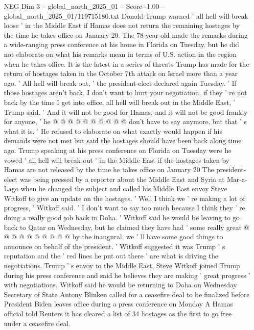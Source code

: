 \begin{textsample}{NEG Dim 3 – global\_north\_2025\_01 – Score -1.00 – global\_north\_2025\_01/119715180.txt}  \label{ex:f3_neg_200}
Donald Trump warned ' all hell will break loose ' in the Middle East if Hamas does not return the remaining hostages by the time he takes office on January 20.
The 78-year-old made the remarks during a wide-ranging press conference at his home in Florida on Tuesday, but he did not elaborate on what his remarks mean in terms of U.S. action in the region when he takes office.
It is the latest in a series of threats Trump has made for the return of hostages taken in the October 7th attack on Israel more than a year ago. ' All hell will break out, ' the president-elect declared again Tuesday. ' If those hostages aren't back, I don't want to hurt your negotiation, if they ' re not back by the time I get into office, all hell will break out in the Middle East, ' Trump said. ' And it will not be good for Hamas, and it will not be good frankly for anyone, ' he @ @ @ @ @ @ @ @ @ @ don't have to say anymore, but that ' s what it is. ' He refused to elaborate on what exactly would happen if his demands were not met but said the hostages should have been back along time ago.
Trump speaking at his press conference on Florida on Tuesday were he vowed ' all hell will break out ' in the Middle East if the hostages taken by Hamas are not released by the time he takes office on January 20 The president-elect was being pressed by a reporter about the Middle East and Syria at Mar-a-Lago when he changed the subject and called his Middle East envoy Steve Witkoff to give an update on the hostages. ' Well I think we ' re making a lot of progress, ' Witkoff said. ' I don't want to say too much because I think they ' re doing a really good job back in Doha. ' Witkoff said he would be leaving to go back to Qatar on Wednesday, but he claimed they have had ' some really great @ @ @ @ @ @ @ @ @ @ by the inaugural, we ' ll have some good things to announce on behalf of the president. ' Witkoff suggested it was Trump ' s reputation and the ' red lines he put out there ' are what is driving the negotiations.
Trump ' s envoy to the Middle East, Steve Witkoff joined Trump during his press conference and said he believes they are making ' great progress ' with negotiations.
Witkoff said he would be returning to Doha on Wednesday Secretary of State Antony Blinken called for a ceasefire deal to be finalized before President Biden leaves office during a press conference on Monday A Hamas official told Reuters it has cleared a list of 34 hostages as the first to go free under a ceasefire deal.

\end{textsample}
